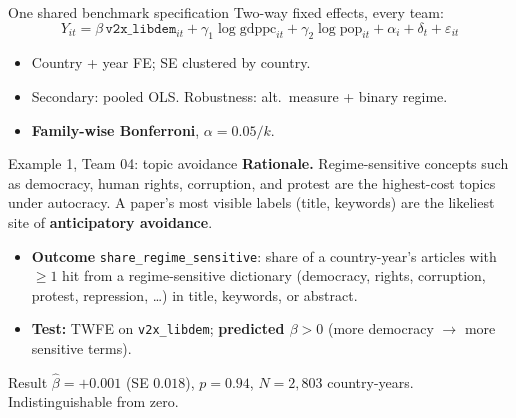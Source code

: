\documentclass[aspectratio=169,11pt]{beamer}
\newcommand{\key}[1]{\textcolor{agentblue}{\textbf{#1}}}
\newcommand{\warn}[1]{\textcolor{gateamber}{#1}}
\begin{document}
\begin{frame}{One shared benchmark specification}
  Two-way fixed effects, every team:
  \begin{equation*}
    Y_{it} = \beta\,\texttt{v2x\_libdem}_{it}
      + \gamma_1 \log\text{gdppc}_{it}
      + \gamma_2 \log\text{pop}_{it}
      + \alpha_i + \delta_t + \varepsilon_{it}
  \end{equation*}
  \begin{itemize}
    \item Country + year FE; SE clustered by country.
    \item Secondary: pooled OLS. Robustness: alt.\ measure + binary regime.
    \item \key{Family-wise Bonferroni}, $\alpha = 0.05/k$.
  \end{itemize}
\end{frame}

\begin{frame}{Example 1, Team 04: topic avoidance}
  \small
  \textbf{Rationale.} Regime-sensitive concepts such as democracy, human rights,
  corruption, and protest are the highest-cost topics under autocracy. A paper's
  most visible labels (title, keywords) are the likeliest site of
  \key{anticipatory avoidance}.
  \vspace{0.4em}
  \begin{itemize}
    \item \textbf{Outcome} \texttt{share\_regime\_sensitive}: share of a
          country-year's articles with $\geq 1$ hit from a regime-sensitive
          dictionary (democracy, rights, corruption, protest, repression, \dots)
          in title, keywords, or abstract.
    \item \textbf{Test:} TWFE on \texttt{v2x\_libdem}; \key{predicted $\beta>0$}
          (more democracy $\rightarrow$ more sensitive terms).
  \end{itemize}
  \vspace{0.3em}
  \begin{block}{Result}
    $\hat\beta = +0.001$ (SE $0.018$), $p = 0.94$, $N = 2{,}803$ country-years.
    \hfill\warn{Indistinguishable from zero.}
  \end{block}
\end{frame}
\end{document}
